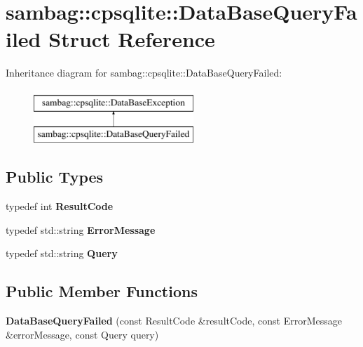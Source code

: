 \hypertarget{structsambag_1_1cpsqlite_1_1_data_base_query_failed}{
\section{sambag::cpsqlite::DataBaseQueryFailed Struct Reference}
\label{structsambag_1_1cpsqlite_1_1_data_base_query_failed}
}
Inheritance diagram for sambag::cpsqlite::DataBaseQueryFailed:\begin{figure}[H]
\begin{center}
\leavevmode
\includegraphics[height=2.000000cm]{structsambag_1_1cpsqlite_1_1_data_base_query_failed}
\end{center}
\end{figure}
\subsection*{Public Types}
\begin{DoxyCompactItemize}
\item 
\hypertarget{structsambag_1_1cpsqlite_1_1_data_base_query_failed_a0a997b43c6d5f0aa557c9b7f09b900bd}{
typedef int {\bfseries ResultCode}}
\label{structsambag_1_1cpsqlite_1_1_data_base_query_failed_a0a997b43c6d5f0aa557c9b7f09b900bd}

\item 
\hypertarget{structsambag_1_1cpsqlite_1_1_data_base_query_failed_aa05918c8b49606c912ecec60ee603809}{
typedef std::string {\bfseries ErrorMessage}}
\label{structsambag_1_1cpsqlite_1_1_data_base_query_failed_aa05918c8b49606c912ecec60ee603809}

\item 
\hypertarget{structsambag_1_1cpsqlite_1_1_data_base_query_failed_adb3fe42d31d866ad440a3e7f1da0c9e1}{
typedef std::string {\bfseries Query}}
\label{structsambag_1_1cpsqlite_1_1_data_base_query_failed_adb3fe42d31d866ad440a3e7f1da0c9e1}

\end{DoxyCompactItemize}
\subsection*{Public Member Functions}
\begin{DoxyCompactItemize}
\item 
\hypertarget{structsambag_1_1cpsqlite_1_1_data_base_query_failed_a4ed591b46a6ea0e06d291506ea94a4df}{
{\bfseries DataBaseQueryFailed} (const ResultCode \&resultCode, const ErrorMessage \&errorMessage, const Query query)}
\label{structsambag_1_1cpsqlite_1_1_data_base_query_failed_a4ed591b46a6ea0e06d291506ea94a4df}

\end{DoxyCompactItemize}
